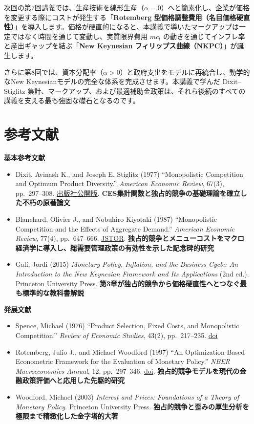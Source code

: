 \documentclass[
  japanese,
  lualatex,
  ja=standard,
  12pt,
  a4paper]{ltjsarticle}
\providecommand{\tightlist}{%
  \setlength{\itemsep}{0pt}\setlength{\parskip}{0pt}}
\begin{document}
次回の第7回講義では、生産技術を線形生産（\(\alpha=0\)）へと簡素化し、企業が価格を変更する際にコストが発生する「\textbf{Rotemberg
型価格調整費用（名目価格硬直性）}」を導入します。価格が硬直的になると、本講義で導いたマークアップは一定ではなく時間を通じて変動し、実質限界費用
\(mc_t\) の動きを通じてインフレ率と産出ギャップを結ぶ「\textbf{New
Keynesian フィリップス曲線（NKPC）}」が誕生します。

さらに第8回では、資本分配率（\(\alpha > 0\)）と政府支出をモデルに再統合し、動学的なNew
Keynesianモデルの完全な体系を完成させます。本講義で学んだ
Dixit--Stiglitz
集計、マークアップ、および最適補助金政策は、それら後続のすべての講義を支える最も強固な礎石となるのです。

\section{参考文献}\label{ux53c2ux8003ux6587ux732e}

\textbf{基本参考文献}

\begin{itemize}
\tightlist
\item
  Dixit, Avinash K., and Joseph E. Stiglitz (1977) ``Monopolistic
  Competition and Optimum Product Diversity.'' \emph{American Economic
  Review}, 67(3), pp.~297--308.
  \href{https://www.aeaweb.org/aer/top20/67.3.297-308.pdf}{出版社公開版}.
  \textbf{CES集計関数と独占的競争の基礎理論を確立した不朽の原著論文}
\item
  Blanchard, Olivier J., and Nobuhiro Kiyotaki (1987) ``Monopolistic
  Competition and the Effects of Aggregate Demand.'' \emph{American
  Economic Review}, 77(4), pp.~647--666.
  \href{https://www.jstor.org/stable/1814537}{JSTOR}.
  \textbf{独占的競争とメニューコストをマクロ経済学に導入し、総需要管理政策の有効性を示した記念碑的研究}
\item
  Galí, Jordi (2015) \emph{Monetary Policy, Inflation, and the Business
  Cycle: An Introduction to the New Keynesian Framework and Its
  Applications} (2nd ed.). Princeton University Press.
  \textbf{第3章が独占的競争から価格硬直性へとつなぐ最も標準的な教科書解説}
\end{itemize}

\textbf{発展文献}

\begin{itemize}
\tightlist
\item
  Spence, Michael (1976) ``Product Selection, Fixed Costs, and
  Monopolistic Competition.'' \emph{Review of Economic Studies}, 43(2),
  pp.~217--235. \href{https://doi.org/10.2307/2297319}{doi}
\item
  Rotemberg, Julio J., and Michael Woodford (1997) ``An
  Optimization-Based Econometric Framework for the Evaluation of
  Monetary Policy.'' \emph{NBER Macroeconomics Annual}, 12,
  pp.~297--346. \href{https://doi.org/10.1086/654340}{doi}.
  \textbf{独占的競争モデルを現代の金融政策評価へと応用した先駆的研究}
\item
  Woodford, Michael (2003) \emph{Interest and Prices: Foundations of a
  Theory of Monetary Policy}. Princeton University Press.
  \textbf{独占的競争と歪みの厚生分析を極限まで精緻化した金字塔的大著}
\end{itemize}
\end{document}
